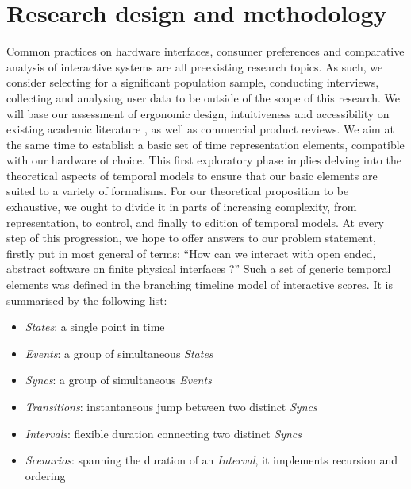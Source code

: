 \documentclass[journal,onecolumn]{IEEEtran}
\begin{document}
\newpage

\section{Research design and methodology} %
Common practices on hardware interfaces, consumer preferences and comparative analysis of interactive systems are all preexisting research topics. As such, we consider selecting for a significant population sample, conducting interviews, collecting and analysing user data to be outside of the scope of this research. We will base our assessment of ergonomic design, intuitiveness and accessibility on existing academic literature \cite{rossmy:grid}\cite{pust:taxonomy}, as well as commercial product reviews. We aim at the same time to establish a basic set of time representation elements, compatible with our hardware of choice. This first exploratory phase implies delving into the theoretical aspects of temporal models \cite{toro:condition}\cite{milliere:topologie} to ensure that our basic elements are suited to a variety of formalisms. For our theoretical proposition to be exhaustive, we ought to divide it in parts of increasing complexity, from representation, to control, and finally to edition of temporal models. At every step of this progression, we hope to offer answers to our problem statement, firstly put in most general of terms: ``How can we interact with open ended, abstract software on finite physical interfaces ?'' 
Such a set of generic temporal elements was defined in the branching timeline model of interactive scores\cite{jcelerier:thesis}. It is summarised by the following list:
\begin{itemize}
    \item \textit{States}: a single point in time
    \item \textit{Events}: a group of simultaneous \textit{States}
    \item \textit{Syncs}: a group of simultaneous \textit{Events}
    \item \textit{Transitions}: instantaneous jump between two distinct \textit{Syncs}
    \item \textit{Intervals}: flexible duration connecting two distinct \textit{Syncs}
    \item \textit{Scenarios}: spanning the duration of an \textit{Interval}, it implements recursion and ordering
\end{itemize}
\end{document}
